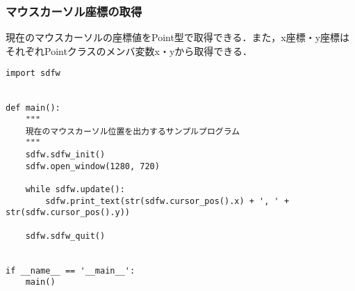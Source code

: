 \documentclass[a4paper, 11pt, oneside, onecolumn, openany]{jsarticle}
\begin{document}
\subsubsection{マウスカーソル座標の取得}
現在のマウスカーソルの座標値をPoint型で取得できる．また，x座標・y座標はそれぞれPointクラスのメンバ変数x・yから取得できる．
\begin{lstlisting}[caption=使用例, label=macro-GetMouseButtonState, keepspaces=true]
import sdfw


def main():
    """
    現在のマウスカーソル位置を出力するサンプルプログラム
    """
    sdfw.sdfw_init()
    sdfw.open_window(1280, 720)

    while sdfw.update():
        sdfw.print_text(str(sdfw.cursor_pos().x) + ', ' + str(sdfw.cursor_pos().y))

    sdfw.sdfw_quit()


if __name__ == '__main__':
    main()
\end{lstlisting}
\end{document}
